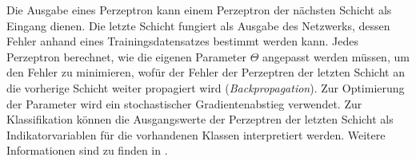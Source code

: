 Die Ausgabe eines Perzeptron kann einem Perzeptron der nächsten Schicht als Eingang dienen. Die letzte Schicht fungiert als Ausgabe des Netzwerks, dessen Fehler anhand eines Trainingsdatensatzes bestimmt werden kann. Jedes Perzeptron berechnet, wie die eigenen Parameter $\Theta$ angepasst werden müssen, um den Fehler zu minimieren, wofür der Fehler der Perzeptren der letzten Schicht an die vorherige Schicht weiter propagiert wird (\textit{Backpropagation}). Zur Optimierung der Parameter wird ein stochastischer Gradientenabstieg verwendet. Zur Klassifikation können die Ausgangswerte der Perzeptren der letzten Schicht als Indikatorvariablen für die vorhandenen Klassen interpretiert werden. Weitere Informationen sind zu finden in \cite{Haykin1994}.